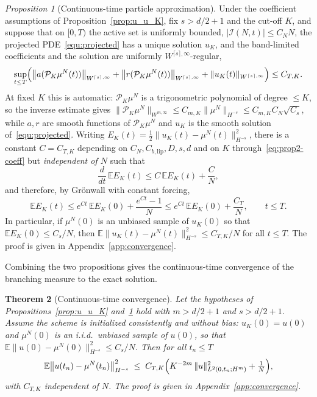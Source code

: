 \documentclass[a4paper,fleqn]{cas-sc}
\newtheorem{theorem}{Theorem}
\theoremstyle{definition}
\theoremstyle{remark}
\newtheorem{proposition}[theorem]{Proposition}
\begin{document}
\begin{proposition}[Continuous-time particle approximation]
\label{prop:u_K_mu}
Under the coefficient assumptions of Proposition~\ref{prop:u_u_K}, fix $s>d/2+1$ and
the cut-off $K$, and suppose that on $[0,T)$ the active set is uniformly bounded,
$|\mathcal I(N,t)|\le C_N N$, the projected PDE~\eqref{equ:projected} has a unique
solution $u_K$, and the band-limited coefficients and the solution are uniformly
$W^{\lceil s\rceil,\infty}$-regular,
\begin{equation}\label{eq:prop2-coeff}
\sup_{t\le T}\Bigl(\bigl\|a(\mathcal P_K\mu^N(t))\bigr\|_{W^{\lceil s\rceil,\infty}}
+\bigl\|r(\mathcal P_K\mu^N(t))\bigr\|_{W^{\lceil s\rceil,\infty}}
+\|u_K(t)\|_{W^{\lceil s\rceil,\infty}}\Bigr)\le C_{T,K}.
\end{equation}
At fixed $K$ this is automatic: $\mathcal P_K\mu^N$ is a trigonometric polynomial of
degree $\le K$, so the inverse estimate gives $\|\mathcal P_K\mu^N\|_{W^{m,\infty}}
\le C_{m,K}\|\mu^N\|_{H^{-s}}\le C_{m,K}C_N\sqrt{C_s}$, while $a,r$ are smooth
functions of $\mathcal P_K\mu^N$ and $u_K$ is the smooth solution
of~\eqref{equ:projected}. Writing $E_K(t)=\tfrac12\|u_K(t)-\mu^N(t)\|_{H^{-s}}^2$,
there is a constant $C=C_{T,K}$ depending on $C_N,C_{b,\mathrm{lip}},D,s,d$ and on
$K$ through~\eqref{eq:prop2-coeff} but \emph{independent of $N$} such that
\begin{equation}\label{eq:prop-uKmu-diff}
\frac{d}{dt}\,\mathbb E E_K(t)\le C\,\mathbb E E_K(t)+\frac{C}{N},
\end{equation}
and therefore, by Gr\"onwall with constant forcing,
\begin{equation}\label{eq:prop-uKmu-bound}
\mathbb E E_K(t)\le e^{Ct}\,\mathbb E E_K(0)+\frac{e^{Ct}-1}{N}
\le e^{Ct}\,\mathbb E E_K(0)+\frac{C_T}{N},\qquad t\le T.
\end{equation}
In particular, if $\mu^N(0)$ is an unbiased sample of $u_K(0)$ so that
$\mathbb E E_K(0)\le C_s/N$, then $\mathbb E\|u_K(t)-\mu^N(t)\|_{H^{-s}}^2\le
C_{T,K}/N$ for all $t\le T$. The proof is given in
Appendix~\ref{app:convergence}.
\end{proposition}

Combining the two propositions gives the continuous-time convergence of the
branching measure to the exact solution.

\begin{theorem}[Continuous-time convergence]
\label{thm:abstract_error}
Let the hypotheses of Propositions~\ref{prop:u_u_K} and~\ref{prop:u_K_mu} hold with
$m>d/2+1$ and $s>d/2+1$. Assume the scheme is initialized consistently and without
bias: $u_K(0)=u(0)$ and $\mu^N(0)$ is an i.i.d.\ unbiased sample of $u(0)$, so that
$\mathbb E\|u(0)-\mu^N(0)\|_{H^{-s}}^2\le C_s/N$. Then for all $t_n\le T$
\begin{equation}\label{eq:u-muN-cont}
\mathbb E\bigl\|u(t_n)-\mu^N(t_n)\bigr\|_{H^{-s}}^2
\;\le\; C_{T,K}\Bigl(K^{-2m}\,\|u\|_{L^2(0,t_n;H^m)}^2+\tfrac1N\Bigr),
\end{equation}
with $C_{T,K}$ independent of $N$. The proof is given in
Appendix~\ref{app:convergence}.
\end{theorem}
\end{document}
